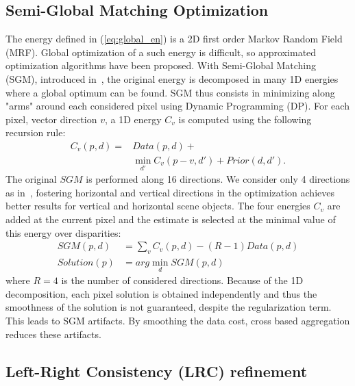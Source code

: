 \documentclass{article}
\begin{document}
\subsection{Semi-Global Matching Optimization}
\label{ss:sgm}

The energy defined in (\ref{eq:global_en}) is a 2D first order Markov Random Field (MRF). Global optimization of a such energy is difficult, so approximated optimization algorithms have been proposed. With Semi-Global Matching (SGM), introduced in~\cite{hirschmuller08}, the original energy is decomposed in many 1D energies where a global optimum can be found. SGM thus consists in minimizing along "arms" around each considered pixel using Dynamic Programming (DP). For each pixel, vector direction $v$, a 1D energy $C_v$ is computed using the following recursion rule:
\begin{equation}
\begin{split}
C_v(p,d) = & Data(p,d) + \\
& \min_{d'}{ C_v(p-v,d') + Prior(d,d')}.
\end{split}
\end{equation}
The original $SGM$ is performed along 16 directions. We consider only 4 directions as in~\cite{zbontar16}, fostering horizontal and vertical directions in the optimization achieves better results for vertical and horizontal scene objects. The four energies $C_v$ are added at the current pixel and the estimate is selected at the minimal value of this energy over disparities:
\begin{equation}
\begin{split}
SGM(p,d) & = \sum_{v} C_v(p,d) - (R-1)Data(p,d) \\
Solution(p) & = arg\min_{d}{SGM(p,d)}
\end{split}
\end{equation}
where $R=4$ is the number of considered directions. Because of the 1D decomposition, each pixel solution is obtained independently and thus the smoothness of the solution is not guaranteed, despite the regularization term. This leads to SGM artifacts. By smoothing the data cost, cross based aggregation reduces these artifacts.

\subsection{Left-Right Consistency (LRC) refinement}
\label{ss:lr_cons}
\end{document}
